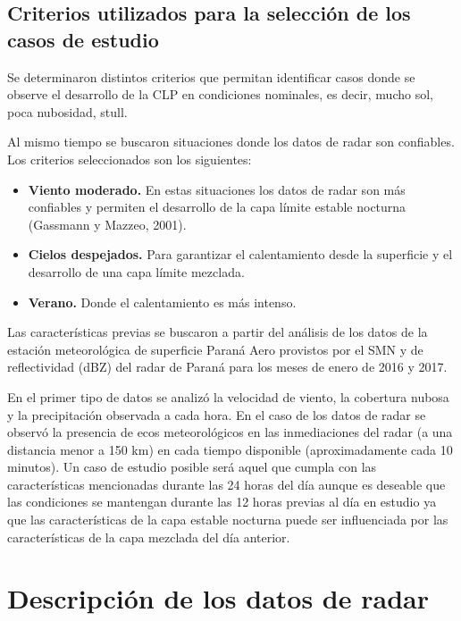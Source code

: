 \documentclass[12pt,spanish,oneside]{book}
\providecommand{\tightlist}{%
  \setlength{\itemsep}{0pt}\setlength{\parskip}{0pt}}
\begin{document}
\subsection{\texorpdfstring{Criterios utilizados para la selección de
los casos de estudio
\label{sec-criterios}}{Criterios utilizados para la selección de los casos de estudio }}\label{criterios-utilizados-para-la-seleccion-de-los-casos-de-estudio}

Se determinaron distintos criterios que permitan identificar casos donde
se observe el desarrollo de la CLP en condiciones nominales, es decir,
mucho sol, poca nubosidad, stull.

Al mismo tiempo se buscaron situaciones donde los datos de radar son
confiables. Los criterios seleccionados son los siguientes:

\begin{itemize}
\tightlist
\item
  \textbf{Viento moderado.} En estas situaciones los datos de radar son
  más confiables y permiten el desarrollo de la capa límite estable
  nocturna (Gassmann y Mazzeo, 2001).
\item
  \textbf{Cielos despejados.} Para garantizar el calentamiento desde la
  superficie y el desarrollo de una capa límite mezclada.
\item
  \textbf{Verano.} Donde el calentamiento es más intenso.
\end{itemize}

Las características previas se buscaron a partir del análisis de los
datos de la estación meteorológica de superficie Paraná Aero provistos
por el SMN y de reflectividad (dBZ) del radar de Paraná para los meses
de enero de 2016 y 2017.

En el primer tipo de datos se analizó la velocidad de viento, la
cobertura nubosa y la precipitación observada a cada hora. En el caso de
los datos de radar se observó la presencia de ecos meteorológicos en las
inmediaciones del radar (a una distancia menor a 150 km) en cada tiempo
disponible (aproximadamente cada 10 minutos). Un caso de estudio posible
será aquel que cumpla con las características mencionadas durante las 24
horas del día aunque es deseable que las condiciones se mantengan
durante las 12 horas previas al día en estudio ya que las
características de la capa estable nocturna puede ser influenciada por
las características de la capa mezclada del día anterior.

\section{Descripción de los datos de
radar}\label{descripcion-de-los-datos-de-radar}
\end{document}
